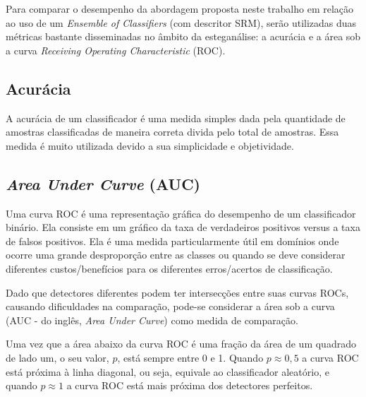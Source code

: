 Para comparar o desempenho da abordagem proposta neste trabalho em relação ao uso de um\textit{ Ensemble of Classifiers} (com descritor SRM), serão utilizadas duas métricas bastante disseminadas no âmbito da esteganálise: a acurácia e a área sob a curva \textit{Receiving Operating Characteristic} (ROC).

\subsection{Acurácia}

A acurácia de um classificador é uma medida simples dada pela quantidade de amostras classificadas de maneira correta divida pelo total de amostras. Essa medida é muito utilizada devido a sua simplicidade e objetividade.


\subsection{\textit{Area Under Curve} (AUC)}

Uma curva ROC é uma representação gráfica do desempenho de um classificador binário. Ela consiste em um gráfico da taxa de verdadeiros positivos versus a taxa de falsos positivos. %
Ela é uma medida particularmente útil em domínios onde ocorre uma grande
desproporção entre as classes ou quando se deve considerar diferentes custos/benefícios para os diferentes erros/acertos de classificação. 



Dado que detectores diferentes podem ter intersecções entre suas curvas ROCs, causando dificuldades na comparação, pode-se considerar a área sob a curva (AUC - do inglês, \textit{Area Under Curve}) como medida de comparação.

Uma vez que a área abaixo da curva ROC é uma fração da área de um quadrado de
lado um, o seu valor, $p$, está sempre entre 0 e 1. Quando $p\approx 0,5$ a curva ROC está próxima à linha diagonal, ou seja, equivale ao classificador aleatório, e quando $p \approx 1$ a curva ROC está mais próxima dos detectores perfeitos.

